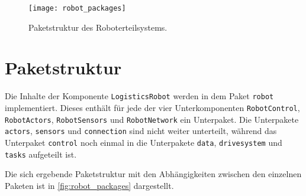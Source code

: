 
\begin{figure}[h]
	\centering
	\texttt{[image: robot\_packages]}
	\caption{Paketstruktur des Roboterteilsystems.}
	\label{fig:robot_packages}
\end{figure}

\section{Paketstruktur}
\label{sec:pakete}



Die Inhalte der Komponente \texttt{LogisticsRobot} werden in dem Paket \texttt{robot} implementiert.
Dieses enthält für jede der vier Unterkomponenten \texttt{RobotControl}, \texttt{RobotActors}, \texttt{RobotSensors} und \texttt{RobotNetwork} ein Unterpaket. 
Die Unterpakete \texttt{actors}, \texttt{sensors} und \texttt{connection} sind nicht weiter unterteilt, während das Unterpaket \texttt{control} noch einmal in die Unterpakete \texttt{data}, \texttt{drivesystem} und \texttt{tasks} aufgeteilt ist.

Die sich ergebende Paketstruktur mit den Abhängigkeiten zwischen den einzelnen Paketen ist in \autoref{fig:robot_packages} dargestellt.
